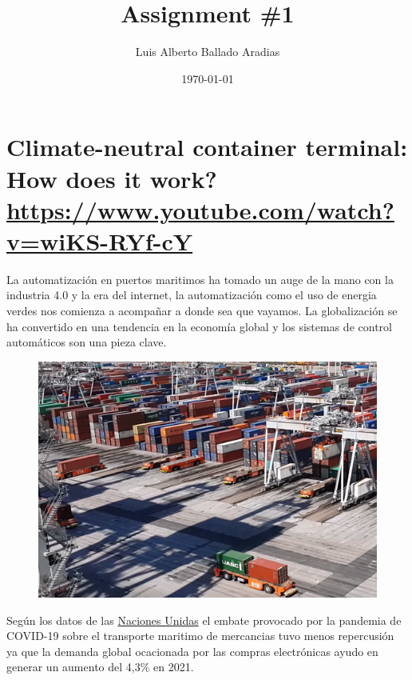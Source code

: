 \documentclass[
	12pt, %
]{fphw}
\title{Assignment \#1} %
\author{Luis Alberto Ballado Aradias} %
\date{\today} %
\institute{Centro de Investigación y de Estudios Avanzados del IPN \\ Unidad Tamaulipas} %
\begin{document}
\maketitle %

\section*{{\color{Apricot}Climate-neutral container terminal: How does it work?} \url{https://www.youtube.com/watch?v=wiKS-RYf-cY}}

La automatización en puertos maritimos ha tomado un auge de la mano con la industria 4.0 y la era del internet, la automatización como el uso de energia verdes nos comienza a acompañar a donde sea que vayamos. La globalización se ha convertido en una tendencia en la economía global y los sistemas de control automáticos son una pieza clave.\\

\begin{figure}[H]
  \centering
  \includegraphics[scale=0.4]{images/puerto.png}
\end{figure}

Según los datos de las \href{https://news.un.org/es/story/2021/11/1500122}{Naciones Unidas} el embate provocado por la pandemia de COVID-19 sobre el transporte maritimo de mercancias tuvo menos repercusión ya que la demanda global ocacionada por las compras electrónicas ayudo en generar un aumento del 4,3\% en 2021. \\
\end{document}

